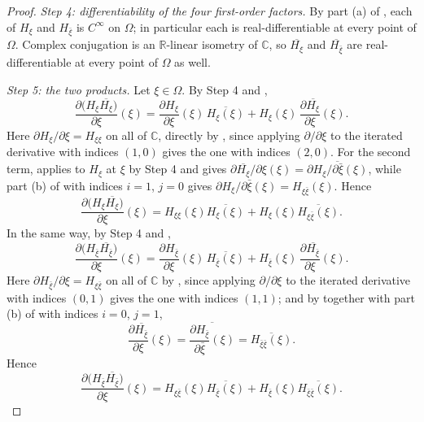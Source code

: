 \begin{proof}
\emph{Step 4: differentiability of the four first-order factors.}  By part (a)
of , each of $H_\xi$ and $H_{\bar\xi}$ is
$C^\infty$ on $\Omega$; in particular each is real-differentiable at every
point of $\Omega$.  Complex conjugation is an $\mathbb{R}$-linear isometry of
$\mathbb{C}$, so $\overline{H_\xi}$ and $\overline{H_{\bar\xi}}$ are
real-differentiable at every point of $\Omega$ as well.

\emph{Step 5: the two products.}  Let $\xi\in\Omega$.  By Step 4 and
,
\[
  \frac{\partial\bigl(H_\xi\overline{H_\xi}\bigr)}{\partial\xi}(\xi)
  =\frac{\partial H_\xi}{\partial\xi}(\xi)\,\overline{H_\xi(\xi)}
   +H_\xi(\xi)\,\frac{\partial\overline{H_\xi}}{\partial\xi}(\xi).
\]
Here $\partial H_\xi/\partial\xi=H_{\xi\xi}$ on all of $\mathbb{C}$, directly
by , since applying $\partial/\partial\xi$ to the
iterated derivative with indices $(1,0)$ gives the one with indices $(2,0)$.
For the second term,  applies to $H_\xi$ at $\xi$ by
Step 4 and gives
$\partial\overline{H_\xi}/\partial\xi(\xi)=\overline{\partial H_\xi/\partial\bar\xi(\xi)}$,
while part (b) of  with indices $i=1$, $j=0$ gives
$\partial H_\xi/\partial\bar\xi(\xi)=H_{\xi\bar\xi}(\xi)$.  Hence
\begin{equation}\tag{2}
  \frac{\partial\bigl(H_\xi\overline{H_\xi}\bigr)}{\partial\xi}(\xi)
  =H_{\xi\xi}(\xi)\overline{H_\xi(\xi)}+H_\xi(\xi)\overline{H_{\xi\bar\xi}(\xi)} .
\end{equation}
In the same way, by Step 4 and ,
\[
  \frac{\partial\bigl(H_{\bar\xi}\overline{H_{\bar\xi}}\bigr)}{\partial\xi}(\xi)
  =\frac{\partial H_{\bar\xi}}{\partial\xi}(\xi)\,\overline{H_{\bar\xi}(\xi)}
   +H_{\bar\xi}(\xi)\,\frac{\partial\overline{H_{\bar\xi}}}{\partial\xi}(\xi).
\]
Here $\partial H_{\bar\xi}/\partial\xi=H_{\xi\bar\xi}$ on all of $\mathbb{C}$
by , since applying $\partial/\partial\xi$ to the
iterated derivative with indices $(0,1)$ gives the one with indices $(1,1)$;
and by  together with part (b) of
 with indices $i=0$, $j=1$,
\[
  \frac{\partial\overline{H_{\bar\xi}}}{\partial\xi}(\xi)
  =\overline{\frac{\partial H_{\bar\xi}}{\partial\bar\xi}(\xi)}
  =\overline{H_{\bar\xi\bar\xi}(\xi)} .
\]
Hence
\begin{equation}\tag{3}
  \frac{\partial\bigl(H_{\bar\xi}\overline{H_{\bar\xi}}\bigr)}{\partial\xi}(\xi)
  =H_{\xi\bar\xi}(\xi)\overline{H_{\bar\xi}(\xi)}
   +H_{\bar\xi}(\xi)\overline{H_{\bar\xi\bar\xi}(\xi)} .
\end{equation}


\end{proof}
